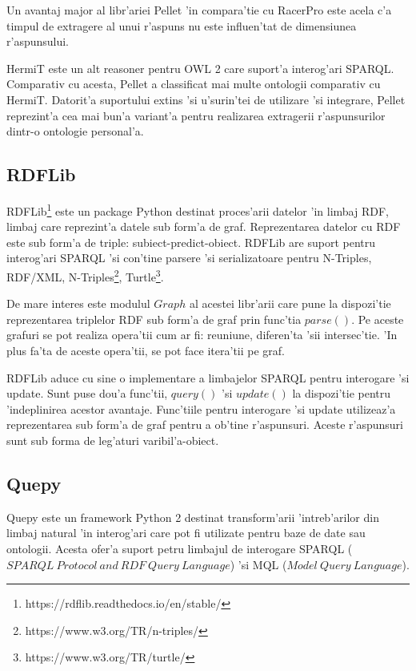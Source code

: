 \documentclass[12pt,a4paper,twoside]{report}
\begin{document}
Un avantaj major al libr'ariei Pellet 'in compara'tie cu RacerPro este acela c'a timpul de extragere al unui r'aspuns nu este influen'tat de dimensiunea r'aspunsului. 

HermiT este un alt reasoner pentru OWL 2 care suport'a interog'ari SPARQL. Comparativ cu acesta, Pellet a classificat mai multe ontologii comparativ cu HermiT. Datorit'a suportului extins 'si u'surin'tei de utilizare 'si integrare,  Pellet reprezint'a cea mai bun'a variant'a pentru realizarea extragerii r'aspunsurilor dintr-o ontologie personal'a. 


\subsection{RDFLib}

RDFLib\footnote{https://rdflib.readthedocs.io/en/stable/} este un package Python destinat proces'arii datelor 'in limbaj RDF, limbaj care reprezint'a datele sub form'a de graf. Reprezentarea datelor cu RDF este sub form'a de triple: subiect-predict-obiect. RDFLib are suport pentru interog'ari SPARQL 'si con'tine parsere 'si serializatoare pentru N-Triples, RDF/XML, N-Triples\footnote{https://www.w3.org/TR/n-triples/}, Turtle\footnote{https://www.w3.org/TR/turtle/}.

De mare interes este modulul $Graph$ al acestei libr'arii care pune la dispozi'tie reprezentarea triplelor RDF sub form'a de graf prin func'tia $parse()$. Pe aceste grafuri se pot realiza opera'tii cum ar fi: reuniune, diferen'ta 'sii intersec'tie. 'In plus fa'ta de aceste opera'tii, se pot face itera'tii pe graf.


RDFLib aduce cu sine o implementare a limbajelor SPARQL pentru interogare 'si update. Sunt puse dou'a func'tii, $query()$ 'si $update()$ la dispozi'tie pentru 'indeplinirea acestor avantaje. Func'tiile pentru interogare 'si update utilizeaz'a reprezentarea sub form'a de graf pentru a ob'tine r'aspunsuri. Aceste r'aspunsuri sunt sub forma de leg'aturi varibil'a-obiect.
\subsection{Quepy}

Quepy este un framework Python 2 destinat transform'arii 'intreb'arilor din limbaj natural 'in interog'ari care pot fi utilizate pentru baze de date sau ontologii. Acesta ofer'a suport petru limbajul de interogare SPARQL ($SPARQL\ Protocol\ and\ RDF\ Query\ Language$) 'si MQL ($Model\ Query\ Language$). 
\end{document}
